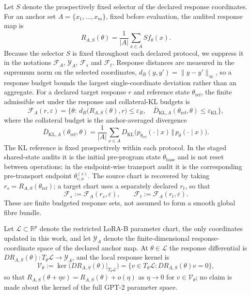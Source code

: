 \documentclass[11pt]{article}
\begin{document}
Let $S$ denote the prospectively fixed selector of the declared response coordinates. For an anchor set
$A=\{x_1,\dots,x_m\}$, fixed before evaluation, the audited response map is
\begin{equation}
R_{A,S}(\theta)=\frac{1}{|A|}\sum_{x\in A} S f_\theta(x).
\end{equation}
Because the selector $S$ is fixed throughout each declared protocol, we suppress it in the notations
$\mathcal{F}_A$, $\mathcal{Y}_A$, $\mathcal{F}_s$ and $\mathcal{F}_t$. Response distances are measured in the
supremum norm on the selected coordinates, $d_R(y,y')=\lVert y-y'\rVert_\infty$, so a response budget bounds the
largest single-coordinate deviation rather than an aggregate.
For a declared target response $r$ and reference state $\theta_{\mathrm{ref}}$, the finite admissible set under
the response and collateral-KL budgets is
\begin{equation}
\mathcal{F}_A(r,\varepsilon)=\bigl\{\theta:\ d_R\bigl(R_{A,S}(\theta),r\bigr)\le\varepsilon_R,\quad
\overline{D}_{\mathrm{KL},A}(\theta_{\mathrm{ref}},\theta)\le\varepsilon_{\mathrm{KL}}\bigr\},
\end{equation}
where the collateral budget is the anchor-averaged divergence
\begin{equation}
\overline{D}_{\mathrm{KL},A}(\theta_{\mathrm{ref}},\theta)=\frac{1}{|A|}\sum_{x\in A}
D_{\mathrm{KL}}\bigl(p_{\theta_{\mathrm{ref}}}(\cdot\mid x)\,\Vert\,p_{\theta}(\cdot\mid x)\bigr).
\end{equation}
The KL reference is fixed prospectively within each protocol. In the staged shared-state audits it is the
initial pre-program state $\theta_{\mathrm{base}}$ and is not reset between operations; in the endpoint-wise
transport audit it is the corresponding pre-transport endpoint $\theta^{(s)}_{c,a}$.
The source chart is recovered by taking $r_s=R_{A,S}(\theta_{\mathrm{ref}})$; a target chart uses a separately
declared $r_t$, so that
\begin{equation}
\mathcal{F}_s:=\mathcal{F}_A(r_s,\varepsilon),\qquad \mathcal{F}_t:=\mathcal{F}_A(r_t,\varepsilon).
\end{equation}
These are finite budgeted response sets, not assumed to form a smooth global fibre bundle.

Let $\mathcal{L}\subset\mathbb{R}^p$ denote the restricted LoRA-B parameter chart, the only coordinates
updated in this work, and let $\mathcal{Y}_A$ denote the finite-dimensional response-coordinate space of the
declared anchor map. At $\theta\in\mathcal{L}$ the response differential is
$DR_{A,S}(\theta):T_\theta\mathcal{L}\to\mathcal{Y}_A$, and the local response kernel is
\begin{equation}
\mathcal{V}_\theta:=\ker\bigl(DR_{A,S}(\theta)\big|_{T_\theta\mathcal{L}}\bigr)
=\bigl\{v\in T_\theta\mathcal{L}: DR_{A,S}(\theta)v=0\bigr\},
\end{equation}
so that $R_{A,S}(\theta+\eta v)=R_{A,S}(\theta)+o(\eta)$ as $\eta\to0$ for $v\in\mathcal{V}_\theta$; no claim is made
about the kernel of the full GPT-2 parameter space.
\end{document}
